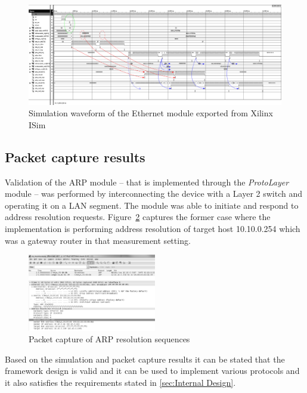 \documentclass[conference]{IEEEtran}
\begin{document}
\begin{figure}[!htb]
    \centering
    \includegraphics[width=1\textwidth]{figures_raw/ether_tst_wave_annotated.png}
    \caption{Simulation waveform of the Ethernet module exported from Xilinx ISim}
    \label{fig:eth_sim}
\end{figure}

\subsection{Packet capture results}

Validation of the ARP module -- that is implemented through the \emph{ProtoLayer} module -- was performed by interconnecting the device with a Layer 2 switch and operating it on a LAN segment. The module was able to initiate and respond to address resolution requests. Figure~\ref{fig:pcap_arp_seq} captures the former case where the implementation is performing address resolution of target host 10.10.0.254 which was a gateway router in that measurement setting.

\begin{figure}[!htb]
    \centering
    \includegraphics[width=0.5\textwidth]{figures_raw/arp_transaction.png}
    \caption{Packet capture of ARP resolution sequences}
    \label{fig:pcap_arp_seq}
\end{figure}

Based on the simulation and packet capture results it can be stated that the framework design is valid and it can be used to implement various protocols and it also satisfies the requirements stated in \ref{sec:Internal Design}.
\end{document}
